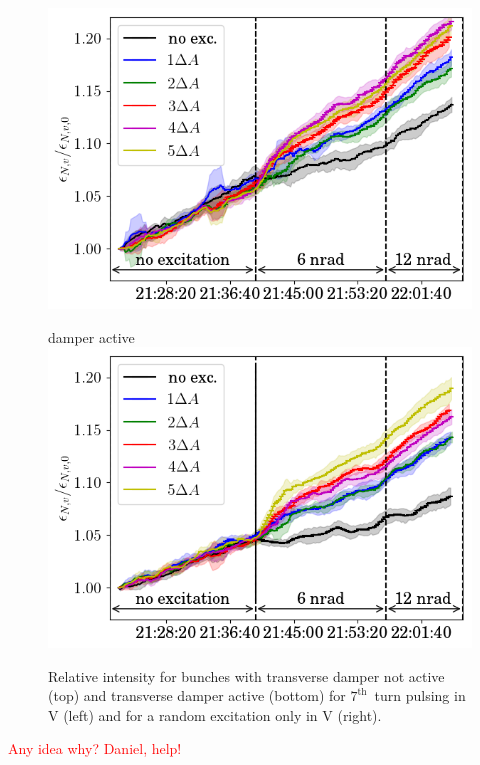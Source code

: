 \documentclass[%
 reprint,
 amsmath,amssymb,
 aps,
prstab,
]{revtex4-1}
\begin{document}
\begin{figure}[h]
\begin{minipage}[t]{0.49\linewidth}
		\includegraphics[width=1.0\linewidth]{2017_emitv_avg_rel_v7th_no_damper_no_text.png}
	\end{minipage}	
	\begin{minipage}[t]{0.49\linewidth}
		\centering
		damper active
		\includegraphics[width=1.0\linewidth]{2017_emitv_avg_rel_v7th_with_damper_no_text.png}
	\end{minipage}	
	\caption{\label{fig:damp} Relative intensity for bunches with transverse damper not active (top) and transverse damper active (bottom) for $7^{\mathrm{th}}$~turn pulsing in V (left) and for a random excitation only in V (right).}
\end{figure}
\textcolor{red}{Any idea why? Daniel, help!}
\end{document}
